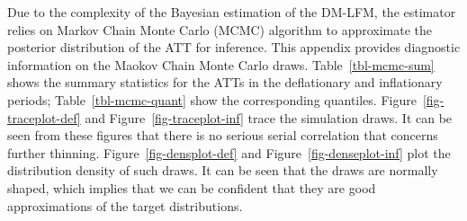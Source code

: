\documentclass[
  a4paper,
  abstract=true]{scrartcl}
\theoremstyle{definition}
\begin{document}
Due to the complexity of the Bayesian estimation of the DM-LFM, the
estimator relies on Markov Chain Monte Carlo (MCMC) algorithm to
approximate the posterior distribution of the ATT for inference. This
appendix provides diagnostic information on the Maokov Chain Monte Carlo
draws. Table~\ref{tbl-mcmc-sum} shows the summary statistics for the
ATTs in the deflationary and inflationary periods;
Table~\ref{tbl-mcmc-quant} show the corresponding quantiles.
Figure~\ref{fig-traceplot-def} and Figure~\ref{fig-traceplot-inf} trace
the simulation draws. It can be seen from these figures that there is no
serious serial correlation that concerns further thinning.
Figure~\ref{fig-densplot-def} and Figure~\ref{fig-denseplot-inf} plot
the distribution density of such draws. It can be seen that the draws
are normally shaped, which implies that we can be confident that they
are good approximations of the target distributions.

\begin{table}[H]

\caption{\label{tbl-mcmc-sum}Summary table of DM-LFM MCMC draws for ATT}


\end{table}%

\begin{table}[H]

\caption{\label{tbl-mcmc-quant}Quantiles of DM-LFM MCMC draws for ATT}


\end{table}%
\end{document}
